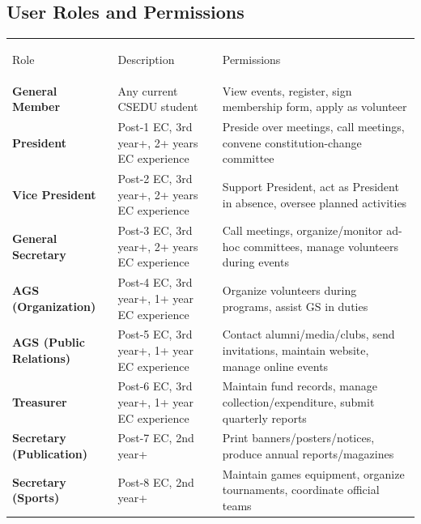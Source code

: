 \documentclass[12pt,a4paper]{article}
\begin{document}
\subsection{User Roles and Permissions}
\noindent
\begin{tabular}{>{\columncolor{Teal}\color{black}\bfseries\small\centering\arraybackslash}p{2.8cm}%
                >{\small\color{DarkGray}}p{4cm}%
                >{\small\color{DarkGray}}p{10cm}}
\rule{0pt}{12pt}Role & \cellcolor{LightGray}Description & \cellcolor{Teal} Permissions \\[0.4pt]

\rowcolor{white} General Member & Any current CSEDU student & View events, register, sign membership form, apply as volunteer \\[1pt]

\rowcolor{LightBlue}President & Post-1 EC, 3rd year+, 2+ years EC experience & Preside over meetings, call meetings, convene constitution-change committee \\[1pt]

\rowcolor{white}Vice President & Post-2 EC, 3rd year+, 2+ years EC experience & Support President, act as President in absence, oversee planned activities \\[1pt]

\rowcolor{LightBlue}General Secretary & Post-3 EC, 3rd year+, 2+ years EC experience & Call meetings, organize/monitor ad-hoc committees, manage volunteers during events \\[1pt]

\rowcolor{white}AGS (Organization) & Post-4 EC, 3rd year+, 1+ year EC experience & Organize volunteers during programs, assist GS in duties \\[1pt]

\rowcolor{LightBlue}AGS (Public Relations) & Post-5 EC, 3rd year+, 1+ year EC experience & Contact alumni/media/clubs, send invitations, maintain website, manage online events \\[1pt]

\rowcolor{white}Treasurer & Post-6 EC, 3rd year+, 1+ year EC experience & Maintain fund records, manage collection/expenditure, submit quarterly reports \\[1pt]

\rowcolor{LightBlue}Secretary (Publication) & Post-7 EC, 2nd year+ & Print banners/posters/notices, produce annual reports/magazines \\[1pt]

\rowcolor{white}Secretary (Sports) & Post-8 EC, 2nd year+ & Maintain games equipment, organize tournaments, coordinate official teams \\[1pt]


\end{tabular}
\end{document}

